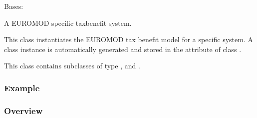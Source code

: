 \documentclass[letterpaper,10pt,english]{sphinxmanual}
\begin{document}

\begin{fulllineitems}
\label{\detokenize{autoapi/euromod/core/index:euromod.core.System}}
\pysigstartsignatures
{}
\pysigstopsignatures
\sphinxAtStartPar
Bases: 

\sphinxAtStartPar
A EUROMOD specific tax\sphinxhyphen{}benefit system.

\sphinxAtStartPar
This class instantiates the EUROMOD tax benefit model for a specific system.
A class instance is automatically generated and stored in the attribute
 of class {\hyperref[\detokenize{autoapi/euromod/core/index:euromod.core.Country}]{}}.

\sphinxAtStartPar
This class contains subclasses of type {\hyperref[\detokenize{autoapi/euromod/core/index:euromod.core.DatasetInSystem}]{}}, and
{\hyperref[\detokenize{autoapi/euromod/core/index:euromod.core.PolicyInSystem}]{}}.
\subsubsection*{Example}

\begin{sphinxVerbatim}[commandchars=\\\{\}]
   
\PYG{p}{[}\PYG{p}{]}\PYG{p}{[}\PYG{p}{]}
\end{sphinxVerbatim}
\subsubsection*{Overview}



\end{fulllineitems}
\end{document}
